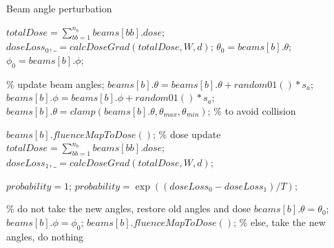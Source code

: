 \documentclass[letterpaper,11pt]{article}
\begin{document}
\begin{algorithm}
	\caption{Beam angle perturbation}
	\begin{algorithmic}[1]
				\State $totalDose=\sum_{bb=1}^{n_b}beams[bb].dose$;
				\State $doseLoss_0, \_ = calcDoseGrad(totalDose,W,d)$;
				\State $\theta_0 = beams[b].\theta$;
				\State $\phi_0 = beams[b].\phi$;
				
				\State
				\State \% update beam angles;
				\State $beams[b].\theta = beams[b].\theta + random01() * s_a$;
				\State $beams[b].\phi = beams[b].\phi + random01() * s_a$;
				\State $beams[b].\theta = clamp(beams[b].\theta, \theta_{max}, \theta_{min})$; \% to avoid collision

				\State
				\State $beams[b].fluenceMapToDose()$; \% dose update
				\State $totalDose=\sum_{bb=1}^{n_b}beams[bb].dose$;
				\State $doseLoss_1, \_ = calcDoseGrad(totalDose,W,d)$;

				\State
					\State $probability=1$;
				\Else
					\State $probability=\exp((doseLoss_0 - doseLoss_1) / T)$;
				\EndIf

				\State
					\State \% do not take the new angles, restore old angles and dose
					\State $beams[b].\theta = \theta_0$;
					\State $beams[b].\phi = \phi_0$;
					\State $beams[b].fluenceMapToDose()$;
				\EndIf
				\State \% else, take the new angles, do nothing
			\EndFor
		\EndProcedure
	\end{algorithmic}
\end{algorithm}
\end{document}

